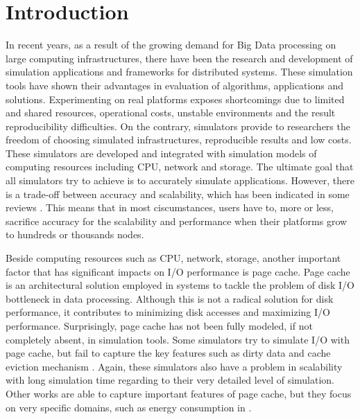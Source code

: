\documentclass[conference]{IEEEtran}
\begin{document}
    \section{Introduction}
        
        In recent years, as a result of the growing demand for Big Data processing 
        on large computing infrastructures, there have been the research and development 
        of simulation applications and frameworks for distributed systems. 
        These simulation tools have shown their advantages in evaluation 
        of algorithms, applications and solutions. 
        Experimenting on real platforms exposes shortcomings due to limited and 
        shared resources, operational costs, unstable environments and the result 
        reproducibility difficulties.
        On the contrary, simulators provide to researchers the freedom of choosing 
        simulated infrastructures, reproducible results and low costs.
        These simulators are developed and integrated with simulation models 
        of computing resources including CPU, network and storage.
        The ultimate goal that all simulators try to achieve is to accurately simulate 
        applications. 
        However, there is a trade-off between accuracy and scalability, which has been 
        indicated in some reviews \cite{casanova2014simgrid} \cite{byrne2017review}. 
        This means that in most ciscumstances, users have to, more or less, sacrifice 
        accuracy for the scalability and performance when their platforms grow to 
        hundreds or thousands nodes. 
        
        Beside computing resources such as CPU, network, storage, another 
        important factor that has significant impacts on I/O performance is 
        page cache. 
        Page cache is an architectural solution employed in systems to tackle 
        the problem of disk I/O bottleneck in data processing. 
        Although this is not a radical solution for disk performance, it contributes 
        to minimizing disk accesses and maximizing I/O performance. 
        Surprisingly, page cache has not been fully modeled, if not completely absent, 
        in simulation tools. 
        Some simulators try to simulate I/O with page cache, but fail to capture the 
        key features such as dirty data and cache eviction mechanism 
        \cite{nunez2012simcan} \cite{nunez2012icancloud}.
        Again, these simulators also have a problem in scalability with 
        long simulation time regarding to their very detailed level of simulation. 
        Other works are able to capture important features of page cache, 
        but they focus on very specific domains, such as energy consumption 
        in \cite{xu2018saving}.
\end{document}

